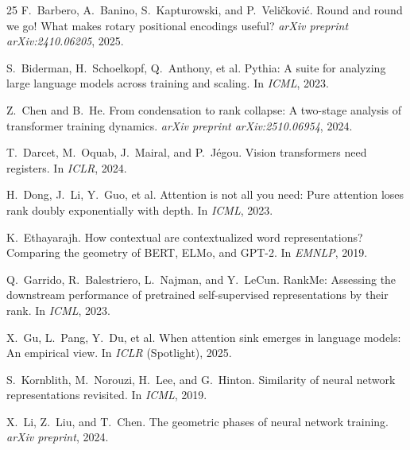 \documentclass[11pt]{article}
\begin{document}

\begin{thebibliography}{25}
F.~Barbero, A.~Banino, S.~Kapturowski, and P.~Veličković.
\newblock Round and round we go! What makes rotary positional encodings useful?
\newblock \emph{arXiv preprint arXiv:2410.06205}, 2025.

S.~Biderman, H.~Schoelkopf, Q.~Anthony, et al.
\newblock Pythia: A suite for analyzing large language models across training and scaling.
\newblock In \emph{ICML}, 2023.

Z.~Chen and B.~He.
\newblock From condensation to rank collapse: A two-stage analysis of transformer training dynamics.
\newblock \emph{arXiv preprint arXiv:2510.06954}, 2024.

T.~Darcet, M.~Oquab, J.~Mairal, and P.~Jégou.
\newblock Vision transformers need registers.
\newblock In \emph{ICLR}, 2024.

H.~Dong, J.~Li, Y.~Guo, et al.
\newblock Attention is not all you need: Pure attention loses rank doubly exponentially with depth.
\newblock In \emph{ICML}, 2023.

K.~Ethayarajh.
\newblock How contextual are contextualized word representations? Comparing the geometry of BERT, ELMo, and GPT-2.
\newblock In \emph{EMNLP}, 2019.

Q.~Garrido, R.~Balestriero, L.~Najman, and Y.~LeCun.
\newblock RankMe: Assessing the downstream performance of pretrained self-supervised representations by their rank.
\newblock In \emph{ICML}, 2023.

X.~Gu, L.~Pang, Y.~Du, et al.
\newblock When attention sink emerges in language models: An empirical view.
\newblock In \emph{ICLR} (Spotlight), 2025.

S.~Kornblith, M.~Norouzi, H.~Lee, and G.~Hinton.
\newblock Similarity of neural network representations revisited.
\newblock In \emph{ICML}, 2019.

X.~Li, Z.~Liu, and T.~Chen.
\newblock The geometric phases of neural network training.
\newblock \emph{arXiv preprint}, 2024.


\end{thebibliography}
\end{document}
